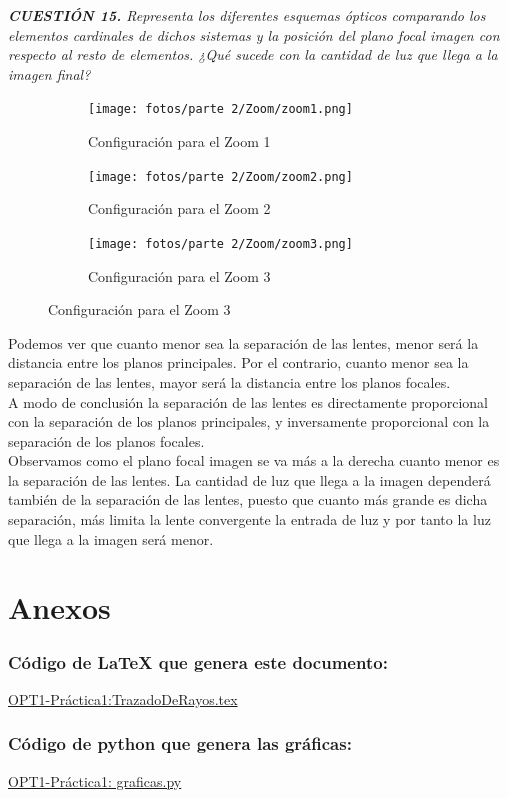 \documentclass[11pt]{article}
\begin{document}
            \textit{\textbf{CUESTIÓN 15.} Representa los diferentes esquemas ópticos comparando los elementos cardinales de dichos sistemas y la posición del plano focal imagen con respecto al resto de elementos. ¿Qué sucede con la cantidad de luz que llega a la imagen final?}            


            \begin{figure}[ht]
                \centering                
                \begin{subfigure}[t]{.49\textwidth}
                    \centering\texttt{[image: fotos/parte 2/Zoom/zoom1.png]}
                    \caption{Configuración para el Zoom 1}
                \end{subfigure}
                \begin{subfigure}[t]{.49\textwidth}
                    \centering\texttt{[image: fotos/parte 2/Zoom/zoom2.png]}
                    \caption{Configuración para el Zoom 2}
                \end{subfigure}

                \begin{subfigure}[t]{.49\textwidth}
                    \centering\texttt{[image: fotos/parte 2/Zoom/zoom3.png]}
                    \caption{Configuración para el Zoom 3}
                \end{subfigure}
            \end{figure}

    \clearpage
    Podemos ver que cuanto menor sea la separación de las lentes, menor será la distancia entre los planos principales. Por el contrario, cuanto menor sea la separación de las lentes, mayor será la distancia entre los planos focales. \\

    A modo de conclusión la separación de las lentes es directamente proporcional con la separación de los planos principales, y inversamente proporcional con la separación de los planos focales.\\

    Observamos como el plano focal imagen se va más a la derecha cuanto menor es la separación de las lentes. La cantidad de luz que llega a la imagen dependerá también de la separación de las lentes, puesto que cuanto más grande es dicha separación, más limita la lente convergente la entrada de luz y por tanto la luz que llega a la imagen será menor.
    
\section{Anexos}
    \subsubsection*{Código de LaTeX que genera este documento:}
        \href{https://www.overleaf.com/read/qgsbffkbrndb#39440e}{OPT1-Práctica1:TrazadoDeRayos.tex}
    \subsubsection*{Código de python que genera las gráficas:}
        \href{https://github.com/vmr48-ua/extras/blob/main/OPT1-P1.py}{OPT1-Práctica1: graficas.py}
\end{document}
